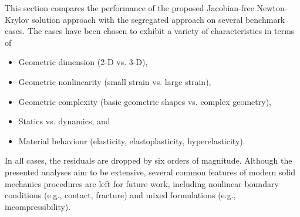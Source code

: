 \documentclass[sn-mathphys,Numbered]{sn-jnl}%
\begin{document}
%	

This section compares the performance of the proposed Jacobian-free Newton-Krylov solution approach with the segregated approach on several benchmark cases.
The cases have been chosen to exhibit a variety of characteristics in terms of
\begin{itemize}
	\item Geometric dimension (2-D vs. 3-D),
	\item Geometric nonlinearity (small strain vs. large strain),
	\item Geometric complexity (basic geometric shapes vs. complex geometry),
	\item Statics vs. dynamics, and
	\item Material behaviour (elasticity, elastoplasticity, hyperelasticity).
\end{itemize}

In all cases, the residuals are dropped by six orders of magnitude. %
Although the presented analyses aim to be extensive, %
several common features of modern solid mechanics procedures are left for future work, including nonlinear boundary conditions (e.g., contact, fracture) and mixed formulations (e.g., incompressibility). %
\end{document}
